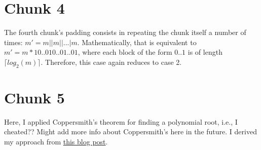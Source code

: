 \documentclass{article}
\begin{document}
\section{Chunk 4}

The fourth chunk's padding consists in repeating the chunk itself a number of times: $m'=m||m||...|m$. Mathematically, that is equivalent to $m'=m*10..010..01..01$, where each block of the form $0..1$ is of length $\lceil log_2(m) \rceil$. Therefore, this case again reduces to case 2.

\section{Chunk 5}

Here, I applied Coppersmith's theorem for finding a polynomial root, i.e., I cheated?? Might add more info about Coppersmith's here in the future. I derived my approach from \href{https://nars1st.tumblr.com/post/179527220982/whistle-crypto-250-220}{this blog post}.
\end{document}
